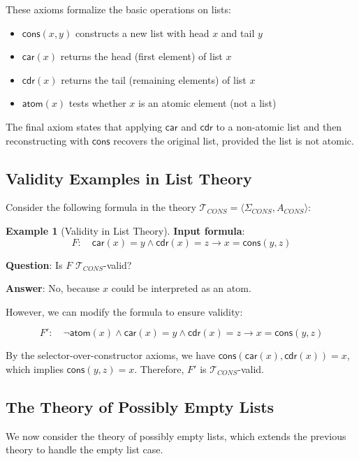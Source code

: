 \documentclass[11pt,a4paper]{article}
\theoremstyle{definition}
\newtheorem{example}{Example}[section]
\theoremstyle{plain}
\theoremstyle{remark}
\begin{document}
These axioms formalize the basic operations on lists:
\begin{itemize}
    \item $\textsf{cons}(x, y)$ constructs a new list with head $x$ and tail $y$
    \item $\textsf{car}(x)$ returns the head (first element) of list $x$
    \item $\textsf{cdr}(x)$ returns the tail (remaining elements) of list $x$
    \item $\textsf{atom}(x)$ tests whether $x$ is an atomic element (not a list)
\end{itemize}

The final axiom states that applying $\textsf{car}$ and $\textsf{cdr}$ to a non-atomic list and then reconstructing with $\textsf{cons}$ recovers the original list, provided the list is not atomic.

\subsection{Validity Examples in List Theory}

Consider the following formula in the theory $\mathcal{T}_{CONS} = \langle \Sigma_{CONS}, A_{CONS} \rangle$:

\begin{example}[Validity in List Theory]
\textbf{Input formula}:
\[
F: \quad \textsf{car}(x) = y \wedge \textsf{cdr}(x) = z \rightarrow x = \textsf{cons}(y, z)
\]

\textbf{Question}: Is $F$ $\mathcal{T}_{CONS}$-valid?

\textbf{Answer}: No, because $x$ could be interpreted as an atom.

However, we can modify the formula to ensure validity:

\[
F': \quad \neg \textsf{atom}(x) \wedge \textsf{car}(x) = y \wedge \textsf{cdr}(x) = z \rightarrow x = \textsf{cons}(y, z)
\]

By the selector-over-constructor axioms, we have $\textsf{cons}(\textsf{car}(x), \textsf{cdr}(x)) = x$, which implies $\textsf{cons}(y, z) = x$. Therefore, $F'$ is $\mathcal{T}_{CONS}$-valid.
\end{example}

\subsection{The Theory of Possibly Empty Lists}

We now consider the theory of possibly empty lists, which extends the previous theory to handle the empty list case.
\end{document}
